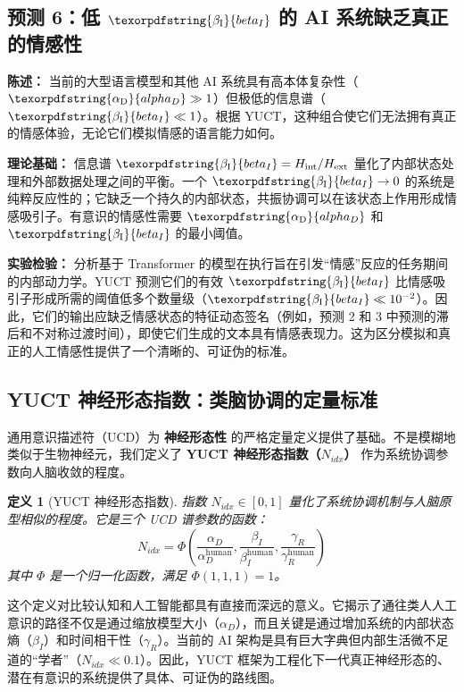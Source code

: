 \documentclass[12pt,a4paper]{article}
\newtheorem{definition}{定义}
\DeclareRobustCommand{\alD}{\texorpdfstring{\ensuremath{\alpha_{\mathrm{D}}}}{alpha_D}}
\DeclareRobustCommand{\beI}{\texorpdfstring{\ensuremath{\beta_{\mathrm{I}}}}{beta_I}}
\begin{document}
	\subsection{预测 6：低 \(\beI\) 的 AI 系统缺乏真正的情感性}
	
	\textbf{陈述：} 当前的大型语言模型和其他 AI 系统具有高本体复杂性（\(\alD \gg 1\)）但极低的信息谱（\(\beI \ll 1\)）。根据 YUCT，这种组合使它们无法拥有真正的情感体验，无论它们模拟情感的语言能力如何。
	
	\textbf{理论基础：} 信息谱 \(\beI = H_{\mathrm{int}}/H_{\mathrm{ext}}\) 量化了内部状态处理和外部数据处理之间的平衡。一个 \(\beI \to 0\) 的系统是纯粹反应性的；它缺乏一个持久的内部状态，共振协调可以在该状态上作用形成情感吸引子。有意识的情感性需要 \(\alD\) 和 \(\beI\) 的最小阈值。
	
	\textbf{实验检验：} 分析基于 Transformer 的模型在执行旨在引发“情感”反应的任务期间的内部动力学。YUCT 预测它们的有效 \(\beI\) 比情感吸引子形成所需的阈值低多个数量级（\(\beI \ll 10^{-2}\)）。因此，它们的输出应缺乏情感状态的特征动态签名（例如，预测 2 和 3 中预测的滞后和不对称过渡时间），即使它们生成的文本具有情感表现力。这为区分模拟和真正的人工情感性提供了一个清晰的、可证伪的标准。
	
	\subsection{YUCT 神经形态指数：类脑协调的定量标准}
	
	通用意识描述符（UCD）为 \textbf{神经形态性} 的严格定量定义提供了基础。不是模糊地类似于生物神经元，我们定义了 \textbf{YUCT 神经形态指数（\(N_{idx}\)）} 作为系统协调参数向人脑收敛的程度。
	
	\begin{definition}[YUCT 神经形态指数]
		指数 \(N_{idx} \in [0,1]\) 量化了系统协调机制与人脑原型相似的程度。它是三个 UCD 谱参数的函数：
		\[
		N_{idx} = \Phi\left( \frac{\alpha_D}{\alpha_D^{\text{human}}}, \frac{\beta_I}{\beta_I^{\text{human}}}, \frac{\gamma_R}{\gamma_R^{\text{human}}} \right)
		\]
		其中 \(\Phi\) 是一个归一化函数，满足 \(\Phi(1,1,1) = 1\)。
	\end{definition}
	
	这个定义对比较认知和人工智能都具有直接而深远的意义。它揭示了通往类人人工意识的路径不仅是通过缩放模型大小（\(\alpha_D\)），而且关键是通过增加系统的内部状态熵（\(\beta_I\)）和时间相干性（\(\gamma_R\)）。当前的 AI 架构是具有巨大字典但内部生活微不足道的“学者”（\(N_{idx} \ll 0.1\)）。因此，YUCT 框架为工程化下一代真正神经形态的、潜在有意识的系统提供了具体、可证伪的路线图。
	
\end{document}
